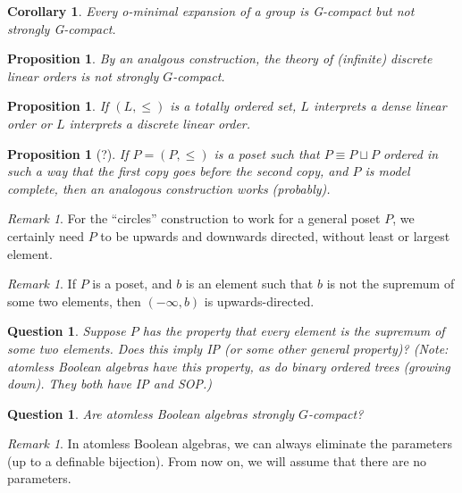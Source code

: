\documentclass[final,a4paper,12pt]{amsart}
\newtheorem{cor}[thm]{Corollary}
\newtheorem{prop}[thm]{Proposition}
\newtheorem{qu}[con]{Question}
\theoremstyle{remark}
\newtheorem{rem}[thm]{Remark}
\theoremstyle{definition}
\begin{document}
	\begin{cor}
		Every o-minimal expansion of a group is G-compact but not strongly G-compact.
	\end{cor}
	
	\begin{prop}
		By an analgous construction, the theory of (infinite) discrete linear orders is not strongly $G$-compact.
	\end{prop}
	
	\begin{prop}
		If $(L,\leq)$ is a totally ordered set, $L$ interprets a dense linear order or $L$ interprets a discrete linear order.
	\end{prop}
	
	\begin{prop}[?]
		If $P=(P,\leq)$ is a poset such that $P\equiv P\sqcup P$ ordered in such a way that the first copy goes before the second copy, and $P$ is model complete, then an analogous construction works (probably).
	\end{prop}
	
	\begin{rem}
		For the ``circles'' construction to work for a general poset $P$, we certainly need $P$ to be upwards and downwards directed, without least or largest element.
	\end{rem}
	
	\begin{rem}
		If $P$ is a poset, and $b$ is an element such that $b$ is not the supremum of some two elements, then $(-\infty,b)$ is upwards-directed.
	\end{rem}
	
	\begin{qu}
		Suppose $P$ has the property that every element is the supremum of some two elements. Does this imply IP (or some other general property)? (Note: atomless Boolean algebras have this property, as do binary ordered trees (growing down). They both have IP and SOP.)
	\end{qu}
	
	\begin{qu}
		Are atomless Boolean algebras strongly $G$-compact?
	\end{qu}
	
	\begin{rem}
		In atomless Boolean algebras, we can always eliminate the parameters (up to a definable bijection). From now on, we will assume that there are no parameters.
	\end{rem}
	
\end{document}
